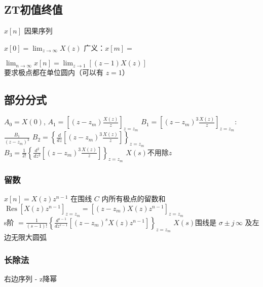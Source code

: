 \subsection{ZT初值终值}
$x[n]$ 因果序列
\begin{description}
\tightlist
\item[初值] $\displaystyle x[0]=\lim_{z\to\infty}X(z)$
广义：$x[m]=$

\item[终值] $\displaystyle \lim_{n\to\infty}x[n]=\lim_{z\to 1}[(z-1)X(z)]$ \\
要求极点都在单位圆内（可以有 $z=1$）

\end{description}

\subsection{部分分式}
\(A_0=X(0)\), 
\(A_1 = \left[(z-z_m)\frac{X(z)}{z}\right]_{z=z_m}\)
\(B_1 = \left[(z-z_m)^3\frac{X(z)}{z}\right]_{z=z_m}\): \(\frac{B_1}{(z-z_m)^3}\)
\(B_2 = \left\{\frac{d}{dz}\left[(z-z_m)^3\frac{X(z)}{z}\right]\right\}_{z=z_m}\)
\(B_3 = \frac{1}{2!}\left\{\frac{d^2}{dz^2}\left[(z-z_m)^3\frac{X(z)}{z}\right]\right\}_{z=z_m}\)
\(X(s)\)不用除\(z\)

\subsubsection{留数}
\(x[n] = X(z)z^{n-1}\) 在围线 \(C\) 内所有极点的留数和
\(\operatorname{Res}{[X(z)z^{n-1}]_{z=z_m}}=[(z-z_m)X(z)z^{n-1}]_{z=z_m}\)\\
s阶 \(=\frac{1}{(s-1)!} \left\{\frac{d^{s-1}}{dz^{s-1}}[(z-z_m)^sX(z)z^{n-1}]\right\}_{z=z_m}\)
\(X(s)\)围线是 \(\sigma\pm j\,\infty\) 及左边无限大圆弧

\subsubsection{长除法}
右边序列 - z降幂
